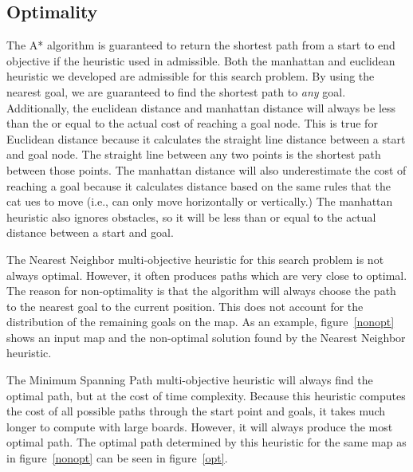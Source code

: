 \documentclass[12pt, conference, compsocconf]{IEEEtran}
\begin{document}
\subsection{Optimality}
The A* algorithm is guaranteed to return the shortest path from a start to end
objective if the heuristic used in admissible.  Both the manhattan and
euclidean heuristic we developed are admissible for this search problem.  By
using the nearest goal, we are guaranteed to find the shortest path to {\em
any} goal.  Additionally, the euclidean distance and manhattan distance will
always be less than the or equal to the actual cost of reaching a goal node.
This is true for Euclidean distance because it calculates the straight line
distance between a start and goal node.  The straight line between any two
points is the shortest path between those points.  The manhattan distance will
also underestimate the cost of reaching a goal because it calculates distance
based on the same rules that the cat ues to move (i.e., can only move
horizontally or vertically.)  The manhattan heuristic also ignores obstacles,
so it will be less than or equal to the actual distance between a start and
goal.

The Nearest Neighbor multi-objective heuristic for this search problem is not
always optimal.  However, it often produces paths which are very close to
optimal.  The reason for non-optimality is that the algorithm will always
choose the path to the nearest goal to the current position.  This does not
account for the distribution of the remaining goals on the map.  As an example,
figure~\ref{nonopt} shows an input map and the non-optimal solution found by
the Nearest Neighbor heuristic.

The Minimum Spanning Path multi-objective heuristic will always find the
optimal path, but at the cost of time complexity.  Because this heuristic
computes the cost of all possible paths through the start point and goals, it
takes much longer to compute with large boards.  However, it will always
produce the most optimal path.  The optimal path determined by this heuristic
for the same map as in figure~\ref{nonopt} can be seen in figure~\ref{opt}.
\end{document}
